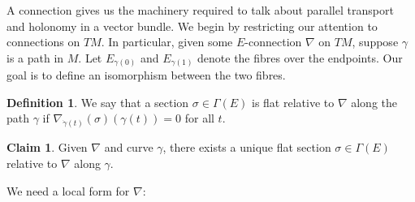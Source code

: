 \documentclass[aps,pra,showpacs,notitlepage,onecolumn,superscriptaddress,nofootinbib]{revtex4-1}
\theoremstyle{definition}
\newtheorem{definition}{Definition}[section]
\newtheorem{claim}{Claim}[section]
\begin{document}
\noindent A connection gives us the machinery required to talk about parallel transport and holonomy in a vector bundle. We begin by restricting our attention to connections on $TM$. In particular, 
given some $E$-connection $\nabla$ on $TM$, suppose $\gamma$ is a path in $M$. Let $E_{\gamma(0)}$ and $E_{\gamma(1)}$ denote the fibres over the endpoints. Our goal is to define an isomorphism 
between the two fibres.

\begin{definition}
We say that a section $\sigma \in \Gamma(E)$ is flat relative to $\nabla$ along the path $\gamma$ if $\nabla_{\dot{\gamma}(t)}(\sigma)(\gamma(t)) = 0$ for all $t$.
\end{definition}

\begin{claim}
    \label{claim:unique}
    Given $\nabla$ and curve $\gamma$, there exists a unique flat section $\sigma \in \Gamma(E)$ relative to $\nabla$ along $\gamma$.
\end{claim}

\noindent We need a local form for $\nabla$:
\end{document}
